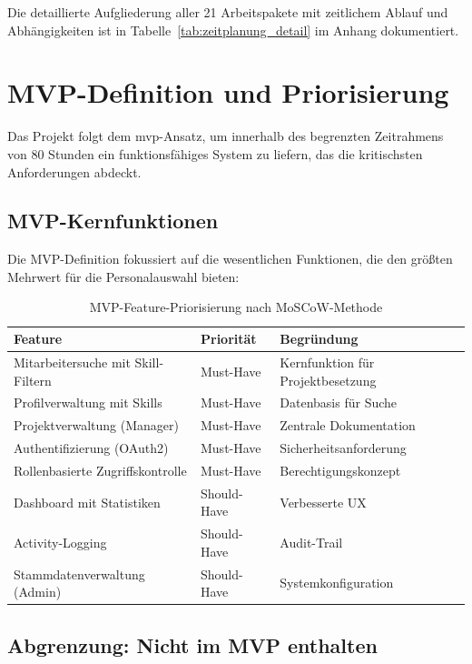 Die detaillierte Aufgliederung aller 21 Arbeitspakete mit zeitlichem Ablauf und Abhängigkeiten ist in Tabelle~\ref{tab:zeitplanung_detail} im Anhang dokumentiert.

\section{MVP-Definition und Priorisierung}

Das Projekt folgt dem \gls{mvp}-Ansatz, um innerhalb des begrenzten Zeitrahmens von 80 Stunden ein funktionsfähiges System zu liefern, das die kritischsten Anforderungen abdeckt.

\subsection{MVP-Kernfunktionen}

Die MVP-Definition fokussiert auf die wesentlichen Funktionen, die den größten Mehrwert für die Personalauswahl bieten:

\begin{table}[H]
\centering
\footnotesize
{}
\begin{tabularx}{\textwidth}{|X|p{2cm}|p{3cm}|}
\hline
\rowcolor{EDAGDunkelgrau!10}
\textbf{Feature} & \textbf{Priorität} & \textbf{Begründung} \\
\hline
Mitarbeitersuche mit Skill-Filtern & Must-Have & Kernfunktion für Projektbesetzung \\
\hline
Profilverwaltung mit Skills & Must-Have & Datenbasis für Suche \\
\hline
Projektverwaltung (Manager) & Must-Have & Zentrale Dokumentation \\
\hline
Authentifizierung (OAuth2) & Must-Have & Sicherheitsanforderung \\
\hline
Rollenbasierte Zugriffskontrolle & Must-Have & Berechtigungskonzept \\
\hline
Dashboard mit Statistiken & Should-Have & Verbesserte UX \\
\hline
Activity-Logging & Should-Have & Audit-Trail \\
\hline
Stammdatenverwaltung (Admin) & Should-Have & Systemkonfiguration \\
\hline
\end{tabularx}
\caption{MVP-Feature-Priorisierung nach MoSCoW-Methode\cite{moscow_method}}
\label{tab:mvp_features}
\end{table}

\subsection{Abgrenzung: Nicht im MVP enthalten}

